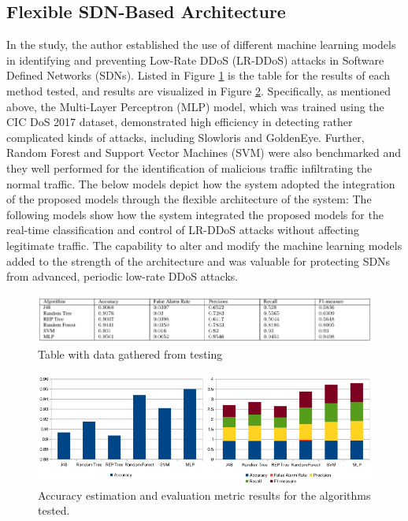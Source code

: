 \documentclass[a4paper, 12pt]{article}
\begin{document}
\subsection{Flexible SDN-Based Architecture}
In the study, the author established the use of different machine learning models in identifying and preventing Low-Rate DDoS (LR-DDoS) attacks in Software Defined Networks (SDNs). Listed in Figure \ref{fig:sdn} is the table for the results of each method tested, and results are visualized in Figure \ref{fig:sdn2}. Specifically, as mentioned above, the Multi-Layer Perceptron (MLP) model, which was trained using the CIC DoS 2017 dataset, demonstrated high efficiency in detecting rather complicated kinds of attacks, including Slowloris and GoldenEye. Further, Random Forest and Support Vector Machines (SVM) were also benchmarked and they well performed for the identification of malicious traffic infiltrating the normal traffic. The below models depict how the system adopted the integration of the proposed models through the flexible architecture of the system: The following models show how the system integrated the proposed models for the real-time classification and control of LR-DDoS attacks without affecting legitimate traffic. The capability to alter and modify the machine learning models added to the strength of the architecture and was valuable for protecting SDNs from advanced, periodic low-rate DDoS attacks. 

\begin{figure}[H]
    \centering
    \includegraphics[width=1\linewidth]{image_sdngraph.png}
    \caption{Table with data gathered from testing \protect{}}
    \label{fig:sdn}
\end{figure}

\begin{figure}[H]
    \centering
    \includegraphics[width=0.8\linewidth]{image_sdn.png}
    \caption{Accuracy estimation and evaluation metric results for the algorithms tested. \protect{}}
    \label{fig:sdn2}
\end{figure}
\end{document}
